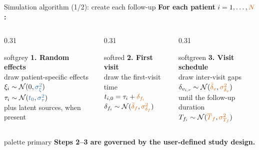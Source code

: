 \documentclass{beamer}
\newcommand{\takeaway}[1]{%
  \begin{beamercolorbox}[rounded=true,sep=0.7ex,wd=\linewidth]{palette primary}
    \centering\bfseries #1
  \end{beamercolorbox}}
\newcommand{\softbox}[2]{%
  \begin{beamercolorbox}[rounded=true,sep=0.8ex,wd=\linewidth]{#1}#2\end{beamercolorbox}}
\newcommand{\fitparam}[1]{\textcolor{FitBlue}{#1}}
\newcommand{\designparam}[1]{\textcolor{DesignOrange}{#1}}
\begin{document}
\begin{frame}{Simulation algorithm (1/2): create each follow-up}
  \centering
  \normalsize\textbf{For each patient }$i=1,\ldots,\designparam{N}$\textbf{:}

  \vspace{0.25em} 
  \begin{columns}[T,onlytextwidth]
    \begin{column}{0.31\textwidth}  
      \softbox{softgrey}{
        \small\centering\textbf{1. Random effects}\\[0.25em]
        {\scriptsize draw patient-specific effects}\\[0.1em]
        $\xi_i\sim\mathcal N(0,\fitparam{\sigma_\xi^2})$\\
        $\tau_i\sim\mathcal N(\fitparam{t_0},\fitparam{\sigma_\tau^2})$\\[0.15em]
        {\scriptsize plus latent sources, when present} 
      }
    \end{column}
    \begin{column}{0.31\textwidth}
      \softbox{softred}{
        \small\centering\textbf{2. First visit}\\[0.25em]
        {\scriptsize draw the first-visit time}\\[0.1em]
        $t_{i,0}=\tau_i+\designparam{\delta_{f_i}}$\\
        $\delta_{f_i}\sim\mathcal N(\designparam{\bar\delta_f},\designparam{\sigma_{\delta_f}^2})$
      }
    \end{column}
    \begin{column}{0.31\textwidth}
      \softbox{softgreen}{
        \small\centering\textbf{3. Visit schedule}\\[0.25em]
        {\scriptsize draw inter-visit gaps}\\[-0.05em]
        $\delta_{v_{i,r}}\sim\mathcal N(\designparam{\bar\delta_v},\designparam{\sigma_{\delta_v}^2})$\\[0.1em]
        {\scriptsize until the follow-up duration}\\[-0.05em]
        $T_{f_i}\sim\mathcal N(\designparam{\overline T_f},\designparam{\sigma_{T_f}^2})$
      }
    \end{column}
  \end{columns}

  \vspace{0.35em}
  \centering

  \vspace{0.15em}
  \takeaway{Steps 2--3 are governed by the user-defined study design.}
\end{frame}
\end{document}
